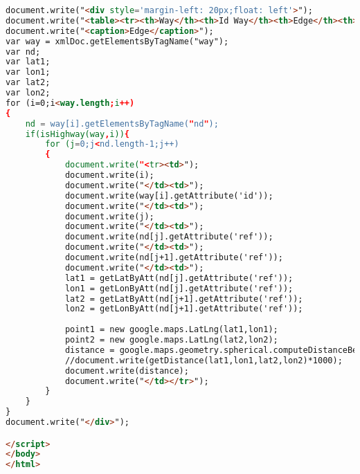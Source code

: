 \begin{lstlisting}[language=HTML,basicstyle=\tiny,caption=xml\_parsing.html]
document.write("<div style='margin-left: 20px;float: left'>");
document.write("<table><tr><th>Way</th><th>Id Way</th><th>Edge</th><th>Id Node 1</th><th>Id Node 2</th><th>Jarak dalam meter</th></tr>");
document.write("<caption>Edge</caption>");
var way = xmlDoc.getElementsByTagName("way");
var nd;
var lat1;
var lon1;
var lat2;
var lon2;
for (i=0;i<way.length;i++)
{
	nd = way[i].getElementsByTagName("nd");
	if(isHighway(way,i)){
		for (j=0;j<nd.length-1;j++)
		{
			document.write("<tr><td>");
			document.write(i);
			document.write("</td><td>");
			document.write(way[i].getAttribute('id'));
			document.write("</td><td>");
			document.write(j);
			document.write("</td><td>");
			document.write(nd[j].getAttribute('ref'));
			document.write("</td><td>");
			document.write(nd[j+1].getAttribute('ref'));
			document.write("</td><td>");
			lat1 = getLatByAtt(nd[j].getAttribute('ref'));
			lon1 = getLonByAtt(nd[j].getAttribute('ref'));
			lat2 = getLatByAtt(nd[j+1].getAttribute('ref'));
			lon2 = getLonByAtt(nd[j+1].getAttribute('ref'));
			
			point1 = new google.maps.LatLng(lat1,lon1);
			point2 = new google.maps.LatLng(lat2,lon2);
			distance = google.maps.geometry.spherical.computeDistanceBetween(point1, point2);
			//document.write(getDistance(lat1,lon1,lat2,lon2)*1000);			
			document.write(distance);			
			document.write("</td></tr>");
		}
	}
}
document.write("</div>");

</script>
</body>
</html>
\end{lstlisting}